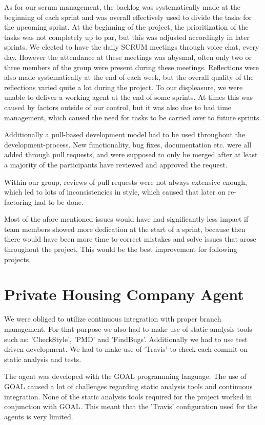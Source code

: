 As for our scrum management, the backlog was systematically made at the beginning of each sprint and was overall effectively used to divide the tasks for the upcoming sprint. At the beginning of the project, the prioritization of the tasks was not completely up to par, but this was adjusted accordingly in later sprints.
We elected to have the daily SCRUM meetings through voice chat, every day. However the attendance at these meetings was abysmal, often only two or three members of the group were present during these meetings.
Reflections were also made systematically at the end of each week, but the overall quality of the reflections varied quite a lot during the project.
To our displeasure, we were unable to deliver a working agent at the end of some sprints. At times this was caused by factors outside of our control, but it was also due to bad time management,
which caused the need for tasks to be carried over to future sprints.

Additionally a pull-based development model had to be used throughout the development-process. New functionality, bug fixes, documentation etc. were all added through pull requests, and were supposed to only be merged after at least a majority of the participants have reviewed and approved the request. 

Within our group, reviews of pull requests were not always extensive enough, which led to lots of inconsistencies in style, which caused that later on re-factoring had to be done.

Most of the afore mentioned issues would have had significantly less impact if team members showed more dedication at the start of a sprint, because then there would have been more time to correct mistakes and solve issues that arose throughout the project. This would be the best improvement for following projects. 

\section{Private Housing Company Agent}
\label{sec:Private Housing Company Agent}

We were obliged to utilize continuous integration with proper branch management. For that purpose we also had to make use of static analysis tools such as: 'CheckStyle', 'PMD' and 'FindBugs'. Additionally we had to use test driven development. We had to make use of 'Travis' to check each commit on static analysis and tests. 

The agent was developed with the GOAL programming language. The use of GOAL caused a lot of challenges regarding static analysis tools and continuous integration. None of the static analysis tools required for the project worked in conjunction with GOAL. This meant that the 'Travis' configuration used for the agents is very limited.

